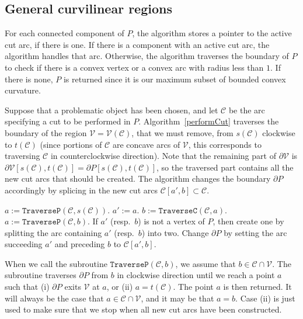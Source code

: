 \documentclass{article}
\newcommand{\ttt}[1]{\texttt{#1}}
\newcommand{\PP}{P}
\newcommand{\VV}{\mathcal V}
\newcommand{\cut}{\mathcal C}
\newcommand{\start}{s}
\newcommand{\terminal}{t}
\newcommand{\mydef}{:=}
\begin{document}
\subsection{General curvilinear regions}\label{anImplementation:general}

For each connected component of $\PP$, the algorithm stores a pointer to the active cut arc, if there is one.
If there is a component with an active cut arc, the algorithm handles that arc.
Otherwise, the algorithm traverses the boundary of $\PP$ to check if there is a convex vertex or a convex arc with radius less than $1$.
If there is none, $\PP$ is returned since it is our maximum subset of bounded convex curvature.

Suppose that a problematic object has been chosen, and let $\cut$ be the arc specifying a cut to be performed in $\PP$.
Algorithm~\ref{performCut} traverses the boundary of the region $\VV=\VV(\cut)$, that we must remove, from $\start(\cut)$ clockwise to $\terminal(\cut)$ (since portions of $\cut$ are concave arcs of $\VV$, this corresponds to traversing $\cut$ in counterclockwise direction).
Note that the remaining part of $\partial\VV$ is $\partial\VV[\start(\cut),\terminal(\cut)]=\partial\PP[\start(\cut),\terminal(\cut)]$, so the traversed part contains all the new cut arcs that should be created.
The algorithm changes the boundary $\partial\PP$ accordingly by splicing in the new cut arcs $\cut[a',b]\subset\cut$.

\begin{algorithm}[h]
\LinesNumbered
\DontPrintSemicolon
\SetArgSty{}
$a\mydef \ttt{TraverseP}(\cut,\start(\cut))$.\; \label{alg1:line1}
\Repeat {$a=\terminal(\cut)$}
{
$a'\mydef a$.\;
$b\mydef \ttt{TraverseC}(\cut,a)$.\;
$a\mydef\ttt{TraverseP}(\cut,b)$.\;
If $a'$ (resp.~$b$) is not a vertex of $\PP$, then create one by splitting the arc containing $a'$ (resp.~$b$) into two. \;
Change $\partial\PP$ by setting the arc succeeding $a'$ and preceding $b$ to $\cut[a',b]$.\;
}
\caption{$\ttt{PerformCut}(\cut)$}
\label{performCut}
\end{algorithm}

When we call the subroutine $\ttt{TraverseP}(\cut,b)$, we assume that $b\in\cut\cap\VV$.
The subroutine traverses $\partial\PP$ from $b$ in clockwise direction until we reach a point $a$ such that (i) $\partial\PP$ exits $\VV$ at $a$, or (ii) $a=\terminal(\cut)$.
The point $a$ is then returned.
It will always be the case that $a\in\cut\cap\VV$, and it may be that $a=b$.
Case (ii) is just used to make sure that we stop when all new cut arcs have been constructed.
\end{document}
